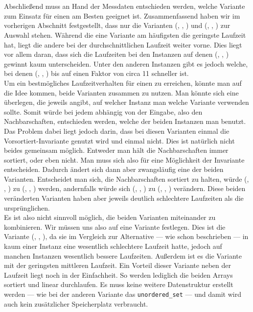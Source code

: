 
\section{}
\label{sec:entscheidung}
Abschließend muss an Hand der Messdaten entschieden werden, welche Variante zum Einsatz für
einen \ct{} am Besten geeignet ist.
Zusammenfassend haben wir im vorherigen Abschnitt festgestellt, 
dass nur die Varianten (\SorSor, \true, \distr) und (\SeaUSet, \false, \perm) zur Auswahl stehen.
Während die eine Variante am häufigsten die geringste Laufzeit hat, liegt die andere 
bei der durchschnittlichen Laufzeit weiter vorne. Dies liegt vor allem daran, dass sich 
die Laufzeiten bei den Instanzen auf denen (\SeaUSet, \false, \perm) \glqq gewinnt\grqq{} kaum unterscheiden.
Unter den anderen Instanzen gibt es jedoch welche, bei denen (\SorSor, \true, \distr) bis auf einen
Faktor von circa 11 schneller ist.
\\
Um ein bestmögliches Laufzeitverhalten für einen \ct{} zu erreichen, könnte man auf die Idee kommen, 
beide Varianten zusammen zu nutzen. Man könnte sich eine  überlegen, die jeweils angibt, 
auf welcher Instanz man welche Variante verwenden sollte. Somit würde bei jedem \ct{} abhängig von 
der Eingabe, also den Nachbarschaften, entschieden werden, welche der beiden Instanzen man benutzt. 
Das Problem dabei liegt jedoch darin, dass bei diesen Varianten einmal die Vorsortiert-Invariante
genutzt wird und einmal nicht. Dies ist natürlich nicht beides gemeinsam möglich. Entweder man hält die
Nachbarschaften immer sortiert, oder eben nicht. Man muss sich also für eine Möglichkeit der
Invariante entscheiden. Dadurch ändert sich dann aber zwangsläufig  eine der beiden Varianten. 
Entscheidet man sich, die Nachbarschaften sortiert zu halten, würde (\SeaUSet, \false, \perm) zu (\SeaUSet, \true, \perm){}
werden, andernfalls würde sich (\SorSor, \true, \distr) zu (\SorSor, \false, \distr) verändern.
Diese beiden \glqq veränderten \grqq{} Varianten haben aber jeweils deutlich schlechtere Laufzeiten
als die ursprünglichen.
\\
Es ist also nicht sinnvoll möglich, die beiden Varianten miteinander zu kombinieren. Wir müssen uns
also auf eine Variante festlegen. Dies ist die Variante (\SorSor, \true, \distr), da sie im Vergleich zur
Alternative --- wie schon beschrieben ---
in kaum einer Instanz eine wesentlich schlechtere Laufzeit hatte, jedoch auf manchen Instanzen wesentlich
bessere Laufzeiten. Außerdem ist es die Variante mit der geringsten mittleren Laufzeit. 
Ein Vorteil dieser Variante neben der Laufzeit liegt noch in der Einfachheit. So werden
lediglich die beiden Arrays sortiert und linear durchlaufen. Es muss keine weitere Datenstruktur
erstellt werden --- wie bei der anderen Variante das \texttt{unordered\_set} --- und damit wird
auch kein zusätzlicher Speicherplatz verbraucht.



